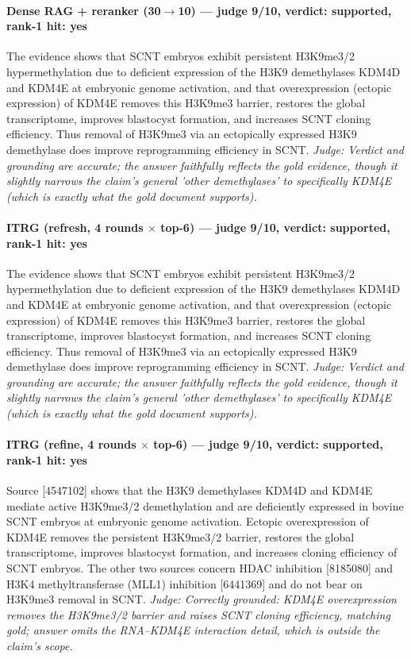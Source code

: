 \documentclass[sigconf, review, anonymous]{acmart}
\begin{document}
\paragraph{Dense RAG + reranker (30$\to$10) --- judge 9/10, verdict: supported, rank-1 hit: yes}
\noindent The evidence shows that SCNT embryos exhibit persistent H3K9me3/2 hypermethylation due to deficient expression of the H3K9 demethylases KDM4D and KDM4E at embryonic genome activation, and that overexpression (ectopic expression) of KDM4E removes this H3K9me3 barrier, restores the global transcriptome, improves blastocyst formation, and increases SCNT cloning efficiency. Thus removal of H3K9me3 via an ectopically expressed H3K9 demethylase does improve reprogramming efficiency in SCNT.
\noindent\small\textit{Judge: Verdict and grounding are accurate; the answer faithfully reflects the gold evidence, though it slightly narrows the claim's general 'other demethylases' to specifically KDM4E (which is exactly what the gold document supports).}
\paragraph{ITRG (refresh, 4 rounds $\times$ top-6) --- judge 9/10, verdict: supported, rank-1 hit: yes}
\noindent The evidence shows that SCNT embryos exhibit persistent H3K9me3/2 hypermethylation due to deficient expression of the H3K9 demethylases KDM4D and KDM4E at embryonic genome activation, and that overexpression (ectopic expression) of KDM4E removes this H3K9me3 barrier, restores the global transcriptome, improves blastocyst formation, and increases SCNT cloning efficiency. Thus removal of H3K9me3 via an ectopically expressed H3K9 demethylase does improve reprogramming efficiency in SCNT.
\noindent\small\textit{Judge: Verdict and grounding are accurate; the answer faithfully reflects the gold evidence, though it slightly narrows the claim's general 'other demethylases' to specifically KDM4E (which is exactly what the gold document supports).}
\paragraph{ITRG (refine, 4 rounds $\times$ top-6) --- judge 9/10, verdict: supported, rank-1 hit: yes}
\noindent Source [4547102] shows that the H3K9 demethylases KDM4D and KDM4E mediate active H3K9me3/2 demethylation and are deficiently expressed in bovine SCNT embryos at embryonic genome activation. Ectopic overexpression of KDM4E removes the persistent H3K9me3/2 barrier, restores the global transcriptome, improves blastocyst formation, and increases cloning efficiency of SCNT embryos. The other two sources concern HDAC inhibition [8185080] and H3K4 methyltransferase (MLL1) inhibition [6441369] and do not bear on H3K9me3 removal in SCNT.
\noindent\small\textit{Judge: Correctly grounded: KDM4E overexpression removes the H3K9me3/2 barrier and raises SCNT cloning efficiency, matching gold; answer omits the RNA--KDM4E interaction detail, which is outside the claim's scope.}
\end{document}
